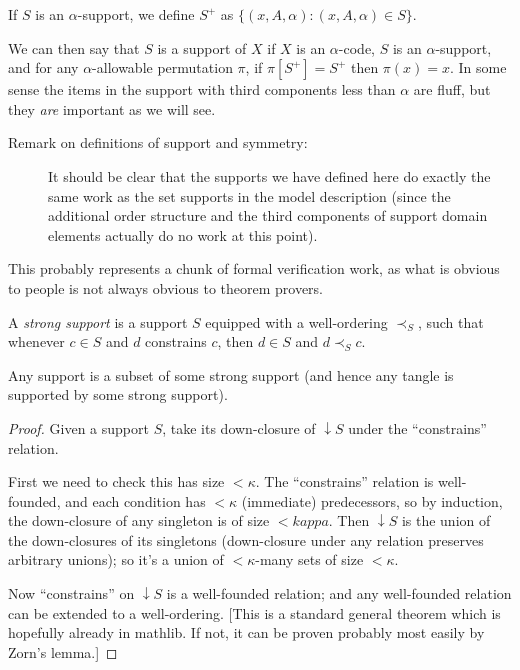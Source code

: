 If $S$ is an $\alpha$-support, we define $S^+$ as $\{(x,A,\alpha):(x,A,\alpha) \in S\}$.

We can then say that $S$ is a support of $X$ if $X$ is an $\alpha$-code, $S$ is an $\alpha$-support, and for any $\alpha$-allowable permutation $\pi$, if $\pi[S^+]=S^+$ then $\pi(x)=x$.  In some sense the items in the support with third components less than $\alpha$ are fluff, but they {\em are\/} important as we will see.

\begin{description}
\item[Remark on definitions of support and symmetry:]  It should be clear that the supports we have defined here do exactly the same work as the set supports in the model description (since the additional order structure and the third components of support domain elements actually do no work at this point).
\end{description}

This probably represents a chunk of formal verification work, as what is obvious to people is not always obvious to theorem provers.

\begin{definition}
  \label{def:strong-support}
  A \emph{strong support} is a support $S$ equipped with a well-ordering $\prec_S$, such that whenever $c \in S$ and $d$ constrains $c$, then $d \in S$ and $d \prec_S c$.
\end{definition}

\begin{lemma}
  \label{lem:strengthen-support}
  Any support is a subset of some strong support (and hence any tangle is supported by some strong support).
\end{lemma}

\begin{proof}
  Given a support $S$, take its down-closure of $\downarrow S$ under the “constrains” relation.

  First we need to check this has size $<\kappa$.  The “constrains” relation is well-founded, and each condition has $<\kappa$ (immediate) predecessors, so by induction, the down-closure of any singleton is of size $<kappa$. Then $ \downarrow S$ is the union of the down-closures of its singletons (down-closure under any relation preserves arbitrary unions); so it’s a union of $<\kappa$-many sets of size $<\kappa$.

  Now “constrains” on $\downarrow S$ is a well-founded relation; and any well-founded relation can be extended to a well-ordering.  [This is a standard general theorem which is hopefully already in mathlib. If not, it can be proven probably most easily by Zorn’s lemma.]
\end{proof}

